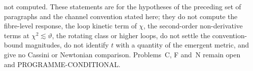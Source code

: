 not computed. These statements are for the hypotheses of the preceding set of paragraphs and the channel convention stated here; they do not compute the fibre-level response, the loop kinetic term of \(\chi\), the second-order non-derivative terms at \(\chi^2\lesssim\vartheta\), the rotating class or higher loops, do not settle the convention-bound magnitudes, do not identify \(t\) with a quantity of the emergent metric, and give no Cassini or Newtonian comparison. Problems~C, F and~N remain open and PROGRAMME-CONDITIONAL.
